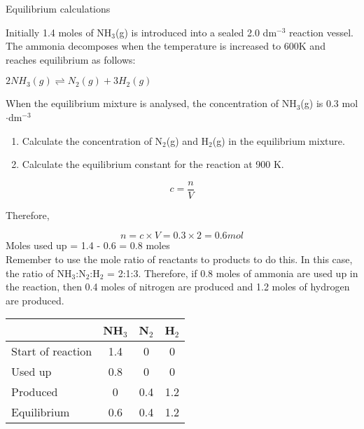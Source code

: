 \begin{wex}{Equilibrium calculations}{Initially 1.4 moles of NH$_{3}$(g) is introduced into a sealed 2.0 dm$^{-3}$ reaction vessel. The ammonia decomposes when the temperature is increased to 600K and reaches equilibrium as follows:

\begin{center}
\rm${2NH_{3}(g) \rightleftharpoons N_{2}(g) + 3H_{2}(g)}$
\end{center}

When the equilibrium mixture is analysed, the concentration of NH$_{3}$(g) is 0.3 mol$\cdot$dm$^{-3}$

\begin{enumerate}
\item{Calculate the concentration of N$_{2}$(g) and H$_{2}$(g) in the equilibrium mixture.}
\item{Calculate the equilibrium constant for the reaction at 900 K.}
\end{enumerate}
}
{

\begin{equation*}
c = \frac{n}{V}
\end{equation*}

Therefore,

\begin{equation*}
n = c \times V = 0.3 \times 2 = 0.6 mol
\end{equation*}
Moles used up = 1.4 - 0.6 = 0.8 moles\\
Remember to use the mole ratio of reactants to products to do this. In this case, the ratio of NH$_{3}$:N$_{2}$:H$_{2}$ = 2:1:3. Therefore, if 0.8 moles of ammonia are used up in the reaction, then 0.4 moles of nitrogen are produced and 1.2 moles of hydrogen are produced.\\

\begin{center}
\begin{tabular}{|l|c|c|c|}\hline
 & \textbf{NH$_{3}$} & \textbf{N$_{2}$} & \textbf{H$_{2}$}\\\hline
Start of reaction & 1.4 & 0 & 0  \\\hline
Used up & 0.8 & 0 & 0  \\\hline
Produced & 0 & 0.4 & 1.2  \\\hline
Equilibrium & 0.6 & 0.4 & 1.2  \\\hline
\end{tabular}
\end{center}

}
\end{wex}
